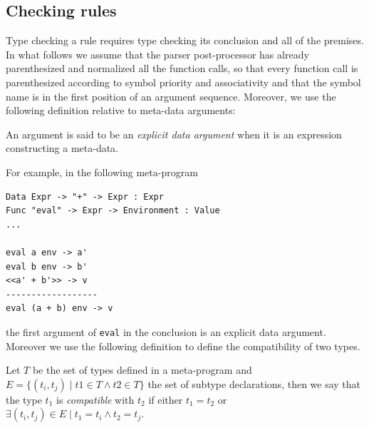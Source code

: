 \subsection{Checking rules}
Type checking a rule requires type checking its conclusion and all of the premises. In what follows we assume that the parser post-processor has already parenthesized and normalized all the function calls, so that every function call is parenthesized according to symbol priority and associativity and that the symbol name is in the first position of an argument sequence. Moreover, we use the following definition relative to meta-data arguments:

\begin{definition}
	An argument is said to be an \textit{explicit data argument} when it is an expression constructing a meta-data.
\end{definition}

\noindent
For example, in the following meta-program

\begin{lstlisting}[caption = Example of an explicit data argument in Metacasanova,  label = code:ch_metacasanova_explicit_data_argument]
Data Expr -> "+" -> Expr : Expr
Func "eval" -> Expr -> Environment : Value
...

eval a env -> a'
eval b env -> b'
<<a' + b'>> -> v
------------------
eval (a + b) env -> v
\end{lstlisting}

\noindent
the first argument of \texttt{eval} in the conclusion is an explicit data argument. Moreover we use the following definition to define the compatibility of two types.

\begin{definition}
\label{def:ch_metacasanova_type_compatibility}
	Let $T$ be the set of types defined in a meta-program and $E = \lbrace (t_i,t_j) \; | \; t1 \in T \wedge t2 \in T \rbrace$ the set of subtype declarations, then we say that the type $t_1$ is \textit{compatible} with $t_2$ if either $t_1 = t_2$ or $\exists (t_i,t_j) \in E \; | \; t_1 = t_i \wedge t_2 = t_j$.
\end{definition}

